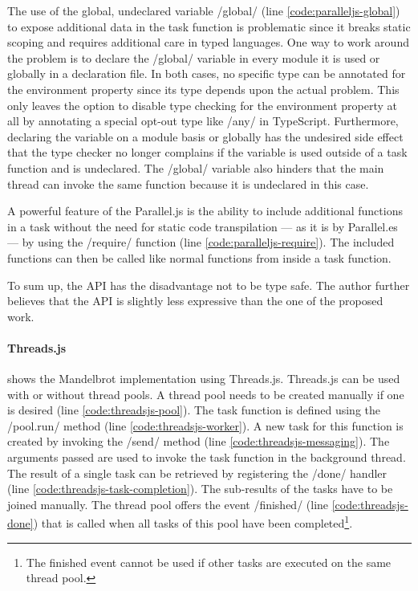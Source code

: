 The use of the global, undeclared variable \javascriptinline/global/ (line \ref{code:paralleljs-global}) to expose additional data in the task function is problematic since it breaks static scoping and requires additional care in typed languages. One way to work around the problem is to declare the \javascriptinline/global/ variable in every module it is used or globally in a declaration file. In both cases, no specific type can be annotated for the environment property since its type depends upon the actual problem. This only leaves the option to disable type checking for the environment property at all by annotating a special opt-out type like \javascriptinline/any/ in TypeScript. Furthermore, declaring the variable on a module basis or globally has the undesired side effect that the type checker no longer complains if the variable is used outside of a task function and is undeclared. The \javascriptinline/global/ variable also hinders that the main thread can invoke the same function because it is undeclared in this case.

A powerful feature of the Parallel.js is the ability to include additional functions in a task without the need for static code transpilation --- as it is by Parallel.es --- by using the \javascriptinline/require/ function (line \ref{code:paralleljs-require}). The included functions can then be called like normal functions from inside a task function. 

To sum up, the API has the disadvantage not to be type safe. The author further believes that the API is slightly less expressive than the one of the proposed work.

\paragraph{Threads.js}
 shows the Mandelbrot implementation using Threads.js. Threads.js can be used with or without thread pools. A thread pool needs to be created manually if one is desired (line \ref{code:threadsjs-pool}). The task function is defined using the \javascriptinline/pool.run/ method (line \ref{code:threadsjs-worker}). A new task for this function is created by invoking the \javascriptinline/send/ method (line \ref{code:threadsjs-messaging}). The arguments passed are used to invoke the task function in the background thread. The result of a single task can be retrieved by registering the \javascriptinline/done/ handler (line \ref{code:threadsjs-task-completion}). The sub-results of the tasks have to be joined manually. The thread pool offers the event \javascriptinline/finished/ (line \ref{code:threadsjs-done}) that is called when all tasks of this pool have been completed\footnote{The finished event cannot be used if other tasks are executed on the same thread pool.}.

